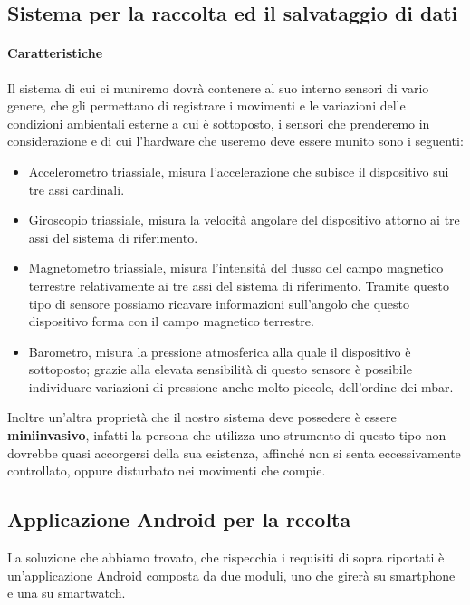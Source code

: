 \documentclass[a4paper]{article}
\begin{document}
	\subsection{Sistema per la raccolta ed il salvataggio di dati}


	\paragraph{Caratteristiche}
Il sistema di cui ci muniremo dovrà contenere al suo interno sensori di vario genere, che gli permettano di registrare i movimenti e le variazioni delle condizioni ambientali esterne a cui è sottoposto, i sensori che prenderemo in considerazione e di cui l'hardware che useremo deve essere munito sono i seguenti:
\begin{itemize}
\item Accelerometro triassiale, misura l’accelerazione che subisce il dispositivo sui tre assi cardinali.
\item Giroscopio triassiale, misura la velocità angolare del dispositivo attorno ai tre assi del sistema di riferimento.
\item Magnetometro triassiale, misura l’intensità del flusso del campo magnetico terrestre relativamente ai tre assi del sistema di riferimento. Tramite questo tipo di sensore possiamo ricavare informazioni sull’angolo che questo dispositivo forma con il campo magnetico terrestre.
\item Barometro, misura la pressione atmosferica alla quale il dispositivo è sottoposto; grazie alla elevata sensibilità di questo sensore è possibile individuare variazioni di pressione anche molto piccole, dell’ordine dei mbar.
\end{itemize}
Inoltre un'altra proprietà che il nostro sistema deve possedere è essere \textbf{miniinvasivo}, infatti la persona che utilizza uno strumento di questo tipo non dovrebbe quasi accorgersi della sua esistenza, affinché non si senta eccessivamente controllato, oppure disturbato nei movimenti che compie.


	\subsection{Applicazione Android per la rccolta}
La soluzione che abbiamo trovato, che rispecchia i requisiti di sopra riportati è un'applicazione Android composta da due moduli, uno che girerà su smartphone e una su smartwatch.
\end{document}
